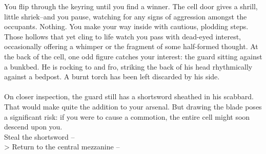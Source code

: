 You flip through the keyring until you find a winner. The cell door gives a shrill, little shriek--and you pause, watching for any signs of aggression amongst the occupants. Nothing. You make your way inside with cautious, plodding steps.\\

Those hollows that yet cling to life watch you pass with dead-eyed interest, occasionally offering a whimper or the fragment of some half-formed thought. At the back of the cell, one odd figure catches your interest: the guard sitting against a bunkbed. He is rocking to and fro, striking the back of his head rhythmically against a bedpost. A burnt torch has been left discarded by his side.\\
\\

On closer inspection, the guard still has a shortsword sheathed in his scabbard. That would make quite the addition to your arsenal. But drawing the blade poses a significant risk: if you were to cause a commotion, the entire cell might soon descend upon you.\\

 Steal the shortsword -- \\
> Return to the central mezzanine -- 
